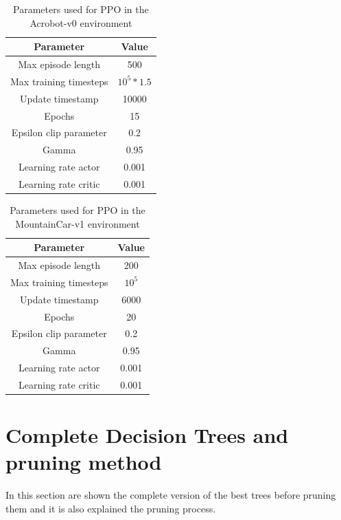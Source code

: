 \begin{table}[h!]
\begin{center}
\begin{tabular}{ |c|c| } 
\hline
\textbf{Parameter} & \textbf{Value} \\
\hline
Max episode length & 500\\
Max training timesteps & $10^5*1.5$\\
Update timestamp & 10000\\
Epochs & 15\\
Epsilon clip parameter & 0.2\\
Gamma & 0.95\\
Learning rate actor & 0.001\\
Learning rate critic & 0.001\\
\hline
\end{tabular}
\caption{Parameters used for PPO in the Acrobot-v0 environment}
\label{table:102}
\end{center}
\end{table}


\begin{table}[h!]
\begin{center}
\begin{tabular}{ |c|c| } 
\hline
\textbf{Parameter} & \textbf{Value} \\
\hline
Max episode length & 200\\
Max training timesteps & $10^5$\\
Update timestamp & 6000\\
Epochs & 20\\
Epsilon clip parameter & 0.2\\
Gamma & 0.95\\
Learning rate actor & 0.001\\
Learning rate critic & 0.001\\
\hline
\end{tabular}
\caption{Parameters used for PPO in the MountainCar-v1 environment}
\label{table:101}
\end{center}
\end{table}



\chapter{Complete Decision Trees and pruning method}
In this section are shown the complete version of the best trees before pruning them and it is also explained the pruning process.

